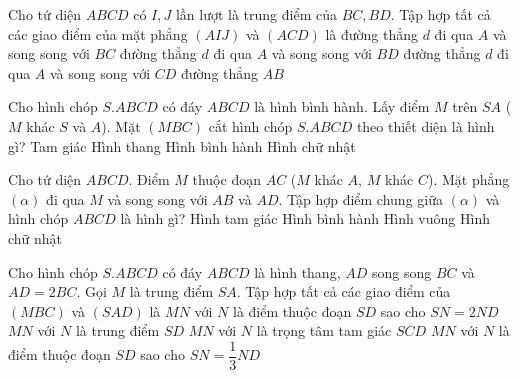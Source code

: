 \begin{ex}%
	Cho tứ diện $ABCD$ có $I,J$ lần lượt là trung điểm của $BC,BD$. Tập hợp tất cả các giao điểm của mặt phẳng $(AIJ)$ và $(ACD)$ là
	\choice
	{ đường thẳng $d$ đi qua $A$ và song song với $BC$}
	{ đường thẳng $d$ đi qua $A$ và song song với $BD$}
	{\True đường thẳng $ d$ đi qua $A$ và song song với $CD$}
	{ đường thẳng $AB$}
\end{ex}
\begin{ex}%
	Cho hình chóp $S.ABCD$ có đáy $ABCD$ là hình bình hành. Lấy điểm $M$ trên $SA$ ($M$ khác $S$ và $A$). Mặt $( MBC )$ cắt hình chóp $S.ABCD$ theo thiết diện là hình gì?
	\choice
	{ Tam giác}
	{\True Hình thang}
	{ Hình bình hành}
	{ Hình chữ nhật}
\end{ex}
\begin{ex}%
	Cho tứ diện $ABCD$. Điểm $M$ thuộc đoạn $AC$ ($M$ khác $A$, $M$ khác $C$). Mặt phẳng $(\alpha)$ đi qua $M$ và song song với $AB$ và $AD$. Tập hợp điểm chung giữa $(\alpha)$ và hình chóp $ABCD$ là hình gì?
	\choice
	{\True Hình tam giác}
	{ Hình bình hành}
	{ Hình vuông}
	{ Hình chữ nhật}
\end{ex}
\begin{ex}%
	Cho hình chóp $S.ABCD$ có đáy $ABCD$ là hình thang, $AD$ song song $BC$ và $AD=2BC$. Gọi $M$ là trung điểm $SA$. Tập hợp tất cả các giao điểm của $(MBC)$ và $(SAD)$ là
	\choice
	{$MN$ với $N$ là điểm thuộc đoạn $SD$ sao cho $SN=2ND$}
	{\True $MN$ với $N$ là trung điểm $SD$}
	{$MN$ với $N$ là trọng tâm tam giác $SCD$}
	{$MN$ với $N$ là điểm thuộc đoạn $SD$ sao cho $SN=\dfrac{1}{3}ND$}
\end{ex}
